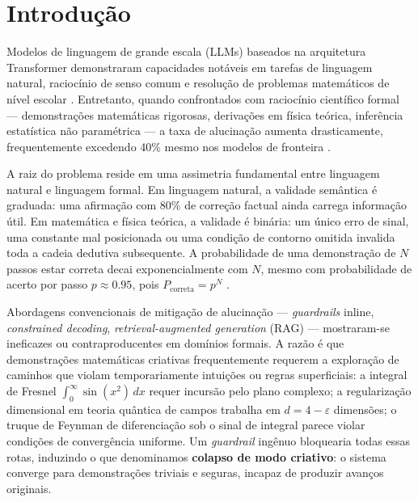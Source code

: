 \documentclass[5p]{elsarticle}
\theoremstyle{remark}
\begin{document}
\section{Introdução}

Modelos de linguagem de grande escala (LLMs) baseados na arquitetura Transformer \cite{Vaswani2017} demonstraram capacidades notáveis em tarefas de linguagem natural, raciocínio de senso comum e resolução de problemas matemáticos de nível escolar \cite{Brown2020GPT3, Bubeck2023Sparks}. Entretanto, quando confrontados com raciocínio científico formal --- demonstrações matemáticas rigorosas, derivações em física teórica, inferência estatística não paramétrica --- a taxa de alucinação aumenta drasticamente, frequentemente excedendo 40\% mesmo nos modelos de fronteira \cite{Frieder2024Mathematical, Collins2024GSM}.

A raiz do problema reside em uma assimetria fundamental entre linguagem natural e linguagem formal. Em linguagem natural, a validade semântica é graduada: uma afirmação com 80\% de correção factual ainda carrega informação útil. Em matemática e física teórica, a validade é binária: um único erro de sinal, uma constante mal posicionada ou uma condição de contorno omitida invalida toda a cadeia dedutiva subsequente. A probabilidade de uma demonstração de $N$ passos estar correta decai exponencialmente com $N$, mesmo com probabilidade de acerto por passo $p \approx 0.95$, pois $P_{\text{correta}} = p^N$ \cite{Frieder2024Mathematical}.

Abordagens convencionais de mitigação de alucinação --- \textit{guardrails} inline, \textit{constrained decoding}, \textit{retrieval-augmented generation} (RAG) --- mostraram-se ineficazes ou contraproducentes em domínios formais. A razão é que demonstrações matemáticas criativas frequentemente requerem a exploração de caminhos que violam temporariamente intuições ou regras superficiais: a integral de Fresnel $\int_0^\infty \sin(x^2)\,dx$ requer incursão pelo plano complexo; a regularização dimensional em teoria quântica de campos trabalha em $d = 4 - \varepsilon$ dimensões; o truque de Feynman de diferenciação sob o sinal de integral parece violar condições de convergência uniforme. Um \textit{guardrail} ingênuo bloquearia todas essas rotas, induzindo o que denominamos \textbf{colapso de modo criativo}: o sistema converge para demonstrações triviais e seguras, incapaz de produzir avanços originais.
\end{document}
